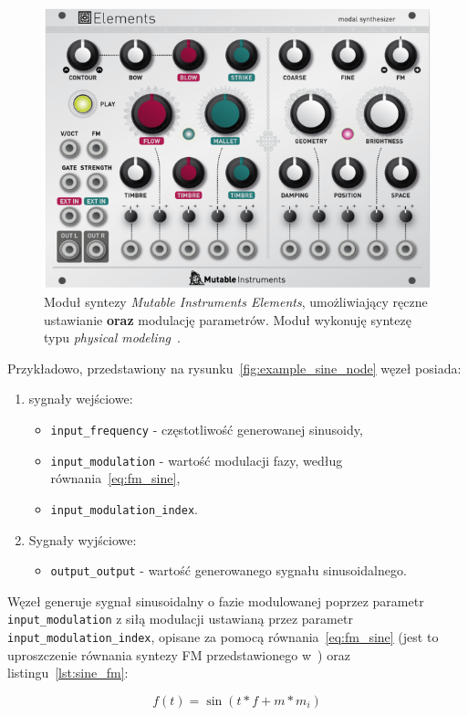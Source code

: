 \begin{figure}[H]\label{fig:example_eurorack_module}
    \centering
    \includegraphics[width=0.45\linewidth]{rys05/mutable_instruments_elements.png}
    \caption{
      Moduł syntezy \textit{Mutable Instruments Elements}, umożliwiający ręczne ustawianie \textbf{oraz} modulację
      parametrów. Moduł wykonuję syntezę typu \textit{physical modeling}~\cite{lisp_synthesis}.
    }
\end{figure}

\noindent
Przykładowo, przedstawiony na rysunku~\ref{fig:example_sine_node} węzeł posiada:
\begin{enumerate}
  \item sygnały wejściowe:
  \begin{itemize}
    \item \texttt{input\_frequency} - częstotliwość generowanej sinusoidy,
    \item \texttt{input\_modulation} - wartość modulacji fazy, według równania~\ref{eq:fm_sine},
    \item \texttt{input\_modulation\_index}.
  \end{itemize}
  \item Sygnały wyjściowe:
  \begin{itemize}
    \item \texttt{output\_output} - wartość generowanego sygnału sinusoidalnego.
  \end{itemize}
\end{enumerate}

\noindent
Węzeł generuje sygnał sinusoidalny o fazie modulowanej poprzez parametr \texttt{input\_modulation} z siłą modulacji ustawianą przez
parametr \texttt{input\_modulation\_index}, opisane za pomocą równania~\ref{eq:fm_sine}
(jest to uproszczenie równania syntezy FM przedstawionego w~\cite{spectral_audio_processing}) oraz listingu~\ref{lst:sine_fm}:

\begin{equation} \label{eq:fm_sine}
  f(t) = \sin(t * f + m * m_i)
\end{equation}

